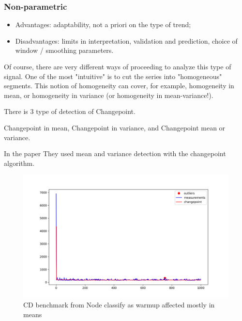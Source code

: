\documentclass{article}
\begin{document}
\subsubsection{Non-parametric}

\begin{itemize}
    \item Advantages: adaptability, not a priori on the type of trend;
    \item Disadvantages: limits in interpretation, validation and prediction, choice of window / smoothing parameters.
\end{itemize}

Of course, there are very different ways of proceeding to analyze this type of signal. One of the most "intuitive" is to cut the series into "homogeneous" segments. This notion of homogeneity can cover, for example, homogeneity in mean, or homogeneity in variance (or homogeneity in mean-variance!).

There is 3 type of detection of Changepoint.

Changepoint in mean, Changepoint in variance, and Changepoint mean or variance.

In the paper \cite{barrett2017virtual} They used mean and variance detection with the changepoint algorithm.



\begin{figure}[h!]
    \centering
    \includegraphics[width=1\textwidth]{images/plot_6_flat.png}
    \caption{CD benchmark from Node classify as warmup affected mostly in means}
    \label{fig:bench_node_flat}
\end{figure}
\end{document}

